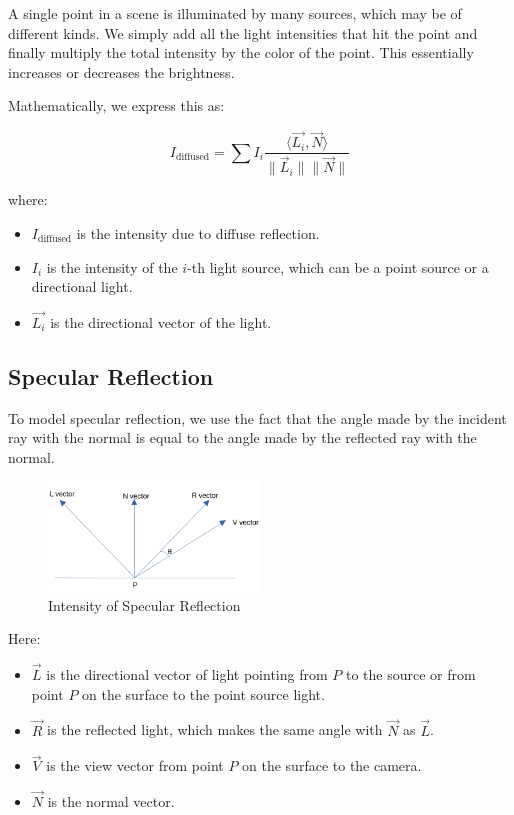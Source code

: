 \documentclass{article}
\begin{document}
A single point in a scene is illuminated by many sources, which may be of different kinds. We simply add all the light intensities that hit the point and finally multiply the total intensity by the color of the point. This essentially increases or decreases the brightness.

Mathematically, we express this as:

\[I_{\text{diffused}} = \sum I_i \frac{\langle \vec{L_i}, \vec{N} \rangle}{\|\vec{L}_i\| \|\vec{N}\|}\]


where:
\begin{itemize}
    \item $I_{\text{diffused}}$ is the intensity due to diffuse reflection.
    \item $I_i$ is the intensity of the $i$-th light source, which can be a point source or a directional light.
    \item $\vec{L_i}$ is the directional vector of the light.
\end{itemize}

\subsection{Specular Reflection}

To model specular reflection, we use the fact that the angle made by the incident ray with the normal is equal to the angle made by the reflected ray with the normal.

\begin{figure}[h]
    \centering
    \includegraphics[width=0.5\textwidth]{./figs/intensityspecular.png}
    \caption{Intensity of Specular Reflection}
\end{figure}

Here:
\begin{itemize}
    \item $\vec{L}$ is the directional vector of light pointing from $P$ to the source or from point $P$ on the surface to the point source light.
    \item $\vec{R}$ is the reflected light, which makes the same angle with $\vec{N}$ as $\vec{L}$.
    \item $\vec{V}$ is the view vector from point $P$ on the surface to the camera.
    \item $\vec{N}$ is the normal vector.
\end{itemize}
\end{document}
